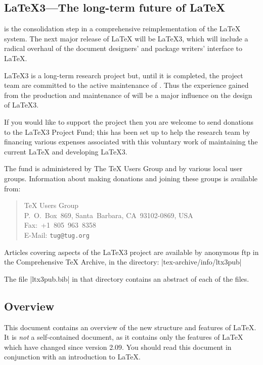 \documentclass{ltxguide}[1994/11/20]
\begin{document}
\subsection{\LaTeX3---The long-term future of \LaTeX}
\label{Sec:ltx3}
 
\LaTeXe{} is the consolidation step in a comprehensive
reimplementation of the \LaTeX{} system.  The next major release of
\LaTeX{} will be \LaTeX3, which will include a radical overhaul of the
document designers' and package writers' interface to \LaTeX.
 
\LaTeX3 is a long-term research project but, until it is completed,
the project team are committed to the active maintenance of \LaTeXe{}.
Thus the experience gained from the production and maintenance of
\LaTeXe{} will be a major influence on the design of \LaTeX3.
 
If you would like to support the project then you are welcome to send
donations to the \LaTeX3 Project Fund; this has been set up to help
the research team by financing various expenses associated with this
voluntary work of maintaining the current \LaTeX{} and developing
\LaTeX3.
 
The fund is administered by The \TeX{} Users Group and by various
local user groups.  Information about making donations and joining
these groups is available from:
 
\begin{quote}
\TeX{} Users Group\\
P.~O.~Box~869, Santa~Barbara, CA~93102-0869, USA\\
Fax:~+1~805~963~8358\\
E-Mail: \texttt{tug@tug.org}
\end{quote}

Articles covering aspects of the \LaTeX3 project are available
by anonymous ftp in the Comprehensive \TeX{} Archive, in the directory:
|tex-archive/info/ltx3pub|

The file |ltx3pub.bib| in that directory
contains an abstract of each of the files.

\subsection{Overview}
 
This document contains an overview of the new structure and features
of \LaTeX.  It is \emph{not} a self-contained document, as it contains
only the features of \LaTeX{} which have changed since version 2.09.
You should read this document in conjunction with an introduction to
\LaTeX{}.
 
\end{document}
